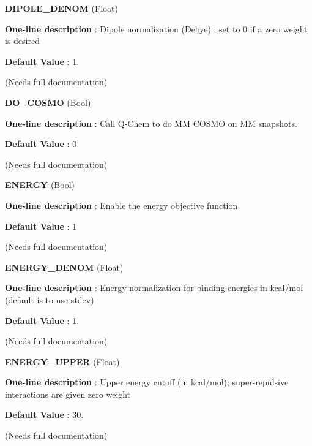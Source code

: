 \begin{DoxyItemize}
\item {\bfseries  \-D\-I\-P\-O\-L\-E\-\_\-\-D\-E\-N\-O\-M } (\-Float) \par
{\bfseries  \-One-\/line description }\-: \-Dipole normalization (\-Debye) ; set to 0 if a zero weight is desired \par
{\bfseries  \-Default \-Value }\-: 1. \par
(\-Needs full documentation)\end{DoxyItemize}
\begin{DoxyItemize}
\item {\bfseries  \-D\-O\-\_\-\-C\-O\-S\-M\-O } (\-Bool) \par
{\bfseries  \-One-\/line description }\-: \-Call \-Q-\/\-Chem to do \-M\-M \-C\-O\-S\-M\-O on \-M\-M snapshots. \par
{\bfseries  \-Default \-Value }\-: 0 \par
(\-Needs full documentation)\end{DoxyItemize}
\begin{DoxyItemize}
\item {\bfseries  \-E\-N\-E\-R\-G\-Y } (\-Bool) \par
{\bfseries  \-One-\/line description }\-: \-Enable the energy objective function \par
{\bfseries  \-Default \-Value }\-: 1 \par
(\-Needs full documentation)\end{DoxyItemize}
\begin{DoxyItemize}
\item {\bfseries  \-E\-N\-E\-R\-G\-Y\-\_\-\-D\-E\-N\-O\-M } (\-Float) \par
{\bfseries  \-One-\/line description }\-: \-Energy normalization for binding energies in kcal/mol (default is to use stdev) \par
{\bfseries  \-Default \-Value }\-: 1. \par
(\-Needs full documentation)\end{DoxyItemize}
\begin{DoxyItemize}
\item {\bfseries  \-E\-N\-E\-R\-G\-Y\-\_\-\-U\-P\-P\-E\-R } (\-Float) \par
{\bfseries  \-One-\/line description }\-: \-Upper energy cutoff (in kcal/mol); super-\/repulsive interactions are given zero weight \par
{\bfseries  \-Default \-Value }\-: 30. \par
(\-Needs full documentation)\end{DoxyItemize}
